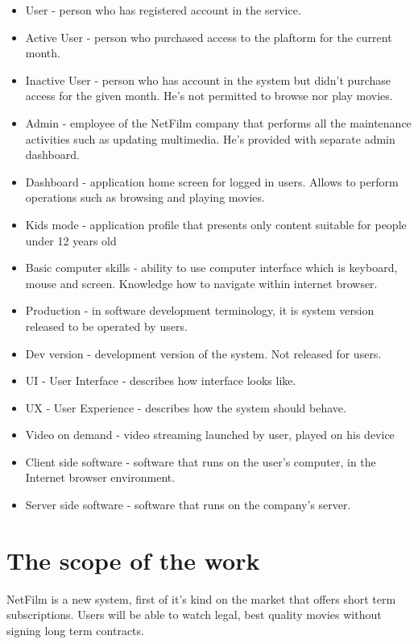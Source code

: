 \documentclass{scrreprt}
\begin{document}
\begin{itemize}
\item User - person who has registered account in the service.
\item Active User - person who purchased access to the plaftorm for the current month.
\item Inactive User - person who has account in the system but didn't purchase access for the given month. He's not permitted to browse nor play movies.
\item Admin - employee of the NetFilm company that performs all the maintenance activities such as updating multimedia. He's provided with separate admin dashboard.
\item Dashboard - application home screen for logged in users. Allows to perform operations such as browsing and playing movies.
\item Kids mode - application profile that presents only content suitable for people under 12 years old
\item Basic computer skills - ability to use computer interface which is keyboard, mouse and screen. Knowledge how to navigate within internet browser.
\item Production - in software development terminology, it is system version released to be operated by users.
\item Dev version - development version of the system. Not released for users.
\item UI - User Interface - describes how interface looks like.
\item UX - User Experience - describes how the system should behave.
\item Video on demand - video streaming launched by user, played on his device
\item Client side software - software that runs on the user's computer, in the Internet browser environment.
\item Server side software - software that runs on the company's server.
\end{itemize}

\section{The scope of the work}

NetFilm is a new system, first of it's kind on the market that offers short term subscriptions. Users will be able to watch legal, best quality movies without signing long term contracts.
\end{document}
